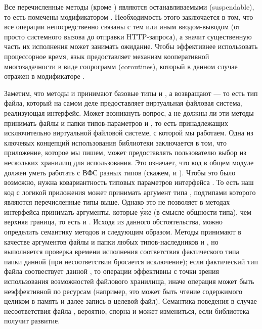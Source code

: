     Все перечисленные методы (кроме ) являются останавливаемыми \cite{kotlin-lang-coro-ru} (suspendable), то есть помечены модификатором . Необходимость этого заключается в том, что все операции непосредственно связаны с тем или иным вводом-выводом (от просто системного вызова до отправки HTTP-запроса), а значит существенную часть их исполнения может занимать ожидание. Чтобы эффективнее использовать процессорное время, язык предоставляет механизм кооперативной многозадачности в виде сопрограмм (coroutines), который в данном случае отражен в модификаторе . 

    Заметим, что методы  и  принимают базовые типы  и , а возвращают  --- то есть тип файла, который на самом деле предоставляет виртуальная файловая система, реализующая интерфейс. Может возникнуть вопрос, а не должны ли эти методы принимать файлы и папки типов-параметров  и , то есть принадлежащих исключительно виртуальной файловой системе, с которой мы работаем. Одна из ключевых концепций использования библиотеки заключается в том, что приложение, которое мы пишем, может предоставлять пользователю выбор из нескольких хранилищ для использования. Это означает, что код в общем модуле должен уметь работать с ВФС разных типов (скажем,  и ). Чтобы это было возможно, нужна ковариантность\cite{kotlin-generics} типовых параметров интерфейса . То есть наш код с логикой приложения может принимать аргумент типа , подтипами которого являются перечисленные типы выше. Однако это не позволяет в методах интерфейса  принимать аргументы, которые \'{у}же (в смысле общности типа), чем верхняя граница, то есть  и . Исходя из данного обстоятельства, можно определить семантику методов  и  следующим образом. Методы принимают в качестве аргументов файлы и папки любых типов-наследников  и , но выполняется проверка времени исполнения соответствия фактического типа папки данной  (при несоответствии бросается исключение); если фактический тип файла соотвествует данной , то операции эффективны с точки зрения использования возможностей файлового хранилища, иначе операция может быть неэффективной по ресурсам (например, это может быть чтение содержимого целиком в память и далее запись в целевой файл). Семантика поведения в случае несоответствия файла , вероятно, спорна и может измениться, если библиотека получит развитие.
    
